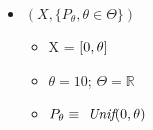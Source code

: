 \documentclass[11pt]{article}
\providecommand{\tightlist}{%
      \setlength{\itemsep}{0pt}\setlength{\parskip}{0pt}}
\begin{document}
\begin{itemize}
\tightlist
\item
  \((X,\{P_{\theta}, \theta \in \Theta\})\)

  \begin{itemize}
  \tightlist
  \vspace{10px}
  \item
    X = \([ 0,\space \theta]\)
    \vspace{5px}
  \item
    \(\theta = 10\); \(\Theta = \mathbb{R}\)
    \vspace{5px}
  \item
    \(P_{\theta} \equiv \textit{ Unif}\space(0, \theta)\)
  \end{itemize}
\end{itemize}



    
    
    
\end{document}
